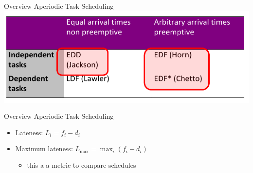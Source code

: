 \begin{frame}{Overview Aperiodic Task Scheduling}
  \centering
  \includegraphics[width=\textwidth]{./figures/overview_aperiodic_task_scheduling.png}
\end{frame}

\begin{frame}{Overview Aperiodic Task Scheduling}
  \begin{itemize}
    \item \alert{Lateness:} $L_i = f_i - d_i$
    \item \alert{Maximum lateness:} $\displaystyle L_{\max }=\max_i\left(f_i-d_i\right)$
    \begin{itemize}
      \item this a a metric to compare schedules
    \end{itemize}
  \end{itemize}
\end{frame}

